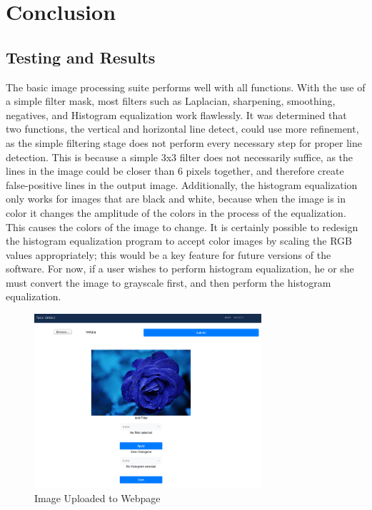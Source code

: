 \documentclass{article}
\let\Oldsection\section
\renewcommand{\section}{\FloatBarrier\Oldsection}
\let\Oldsubsection\subsection
\renewcommand{\subsection}{\FloatBarrier\Oldsubsection}
\begin{document}
  \newpage

  \section{Conclusion}

  \subsection{Testing and Results}

  The basic image processing suite performs well with all functions. With the use of a simple filter mask, most filters such as Laplacian, sharpening, smoothing, negatives, and Histogram equalization work flawlessly. It was determined that two functions, the vertical and horizontal line detect, could use more refinement, as the simple filtering stage does not perform every necessary step for proper line detection. This is because a simple 3x3 filter does not necessarily suffice, as the lines in the image could be closer than 6 pixels together, and therefore create false-positive lines in the output image. Additionally, the histogram equalization only works for images that are black and white, because when the image is in color it changes the amplitude of the colors in the process of the equalization. This causes the colors of the image to change. It is certainly possible to redesign the histogram equalization program to accept color images by scaling the RGB values appropriately; this would be a key feature for future versions of the software. For now, if a user wishes to perform histogram equalization, he or she must convert the image to grayscale first, and then perform the histogram equalization.

  \begin{figure}[!htb]
    \centering
    \includegraphics[width=0.75\textwidth]{assets/image_uploaded.png}
    \caption{Image Uploaded to Webpage}
    \label{fig:image-uploaded}
  \end{figure}
\end{document}
